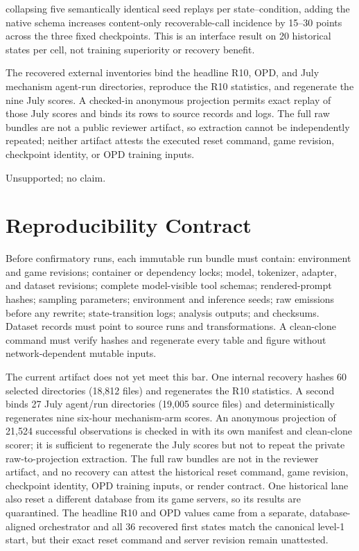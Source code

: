\documentclass[11pt,a4paper]{article}
\begin{document}
\begin{description}
collapsing five semantically identical seed replays per state--condition, adding
the native schema increases content-only recoverable-call incidence by
15--30 points across the three fixed checkpoints. This is an interface result
on 20 historical states per cell, not training superiority or recovery benefit.
\item[Historical bundles.] The recovered external inventories bind the headline
R10, OPD, and July mechanism agent-run directories, reproduce the R10
statistics, and regenerate the nine July scores. A checked-in anonymous
projection permits exact replay of those July scores and binds its rows to
source records and logs. The full raw bundles are not a public reviewer
artifact, so extraction cannot be independently repeated; neither artifact
attests the executed reset command, game revision, checkpoint identity, or OPD
training inputs.
\item[Cross-task transfer.] Unsupported; no claim.
\end{description}

\section{Reproducibility Contract}

Before confirmatory runs, each immutable run bundle must contain: environment and
game revisions; container or dependency locks; model, tokenizer, adapter, and
dataset revisions; complete model-visible tool schemas; rendered-prompt hashes;
sampling parameters; environment and inference seeds; raw emissions before any
rewrite; state-transition logs; analysis outputs; and checksums. Dataset records
must point to source runs and transformations. A clean-clone command must verify
hashes and regenerate every table and figure without network-dependent mutable
inputs.

The current artifact does not yet meet this bar. One internal recovery hashes 60
selected directories (18,812 files) and regenerates the R10 statistics. A
second binds 27 July agent/run directories (19,005 source files) and
deterministically regenerates nine six-hour mechanism-arm scores. An anonymous
projection of 21,524 successful observations is checked in with its own
manifest and clean-clone scorer; it is sufficient to regenerate the July
scores but not to repeat the private raw-to-projection extraction. The full raw
bundles are not in the reviewer artifact, and no recovery can attest the
historical reset command, game revision, checkpoint identity, OPD training
inputs, or render contract. One historical lane
also reset a different database from its game servers, so its results are
quarantined. The headline R10 and OPD values came from a separate,
database-aligned orchestrator and all 36 recovered first states match the
canonical level-1 start, but their exact reset command and server revision
remain unattested.
\end{document}
